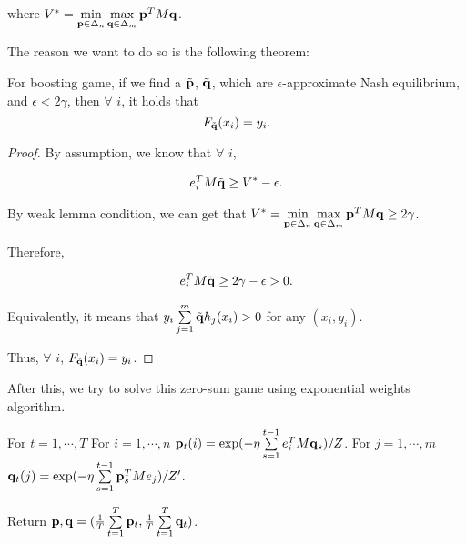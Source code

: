 \documentclass[main.tex]{subfiles}
\begin{document}
where $V^* = \min\limits_{\mathbf{p} \in \Delta_n} \max\limits_{\mathbf{q} \in \Delta_m} \mathbf{p}^T M \mathbf{q}$.

The reason we want to do so is the following theorem:

\begin{theorem}
For boosting game, if we find a $\tilde{\mathbf{p}}$, $\tilde{\mathbf{q}}$, which are $\epsilon$-approximate Nash equilibrium, and $\epsilon < 2 \gamma$, then $\forall$ $i$, it holds that 
\begin{equation}
F_{\tilde{\mathbf{q}}} (x_i) = y_i.
\end{equation}
\end{theorem}

\begin{proof}
By assumption, we know that $\forall$ $i$, 

\begin{equation*}
	\begin{aligned}
		e_i^T M \tilde{\mathbf{q}} \geq V^* -\epsilon. 
	\end{aligned}
\end{equation*}

By weak lemma condition, we can get that $V^* = \min\limits_{\mathbf{p} \in \Delta_n} \max\limits_{\mathbf{q} \in \Delta_m} \mathbf{p}^T M \mathbf{q} \geq 2\gamma$.

Therefore, 

\begin{equation*}
\begin{aligned}
e_i^T M \tilde{\mathbf{q}} \geq 2\gamma -\epsilon > 0. 
\end{aligned}
\end{equation*}

Equivalently, it means that $y_i \sum\limits_{j=1}^m \tilde{\mathbf{q}}  h_j(x_i) > 0 $ for any $(x_i, y_i)$. 

Thus, $\forall$ $i$, $F_{\tilde{\mathbf{q}}} (x_i) = y_i$.
\end{proof}

After this, we try to solve this zero-sum game using exponential weights algorithm.

\begin{algorithm}
	\begin{algorithmic}
		\STATE For $t = 1, \cdots ,T$
		\bindent
		\STATE For $i = 1, \cdots , n$
		\bindentt
			\STATE $\mathbf{p}_t(i) = \exp(-\eta \sum\limits_{s=1}^{t-1} e_i^T M\mathbf{q}_s) / Z$.
		\eindentt
		\STATE For $j = 1, \cdots , m$
		\bindentt
			\STATE $\mathbf{q}_t(j) = \exp(-\eta \sum\limits_{s=1}^{t-1} \mathbf{p}_s^T M e_j) / Z'$.
		\eindentt
		
		Return $\mathbf{p}, \mathbf{q} = (\frac{1}{T} \sum\limits_{t = 1}^T \mathbf{p}_t, \frac{1}{T} \sum\limits_{t = 1}^T \mathbf{q}_t) $. 
		\eindent
	\end{algorithmic}
\end{algorithm}
\end{document}
